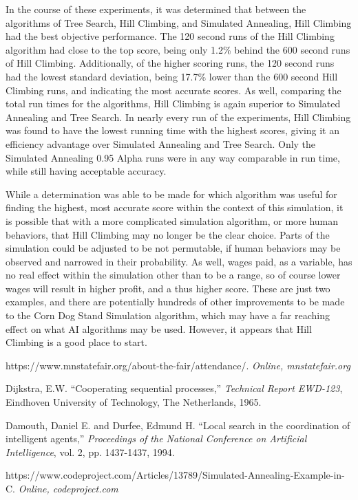 \documentclass[10pt, twocolumn]{article}
\begin{document}
In the course of these experiments, it was determined that between the algorithms of
Tree Search, Hill Climbing, and Simulated Annealing, Hill Climbing had the best objective performance.
The 120 second runs of the Hill Climbing algorithm had close to the top score, being only
1.2\% behind the 600 second runs of Hill Climbing. Additionally, of the higher scoring runs,
the 120 second runs had the lowest standard deviation, being 17.7\% lower than the 600 second Hill Climbing
runs, and indicating the most accurate scores.
As well, comparing the total run times for the algorithms, Hill Climbing is again superior to
Simulated Annealing and Tree Search. In nearly every run of the experiments, Hill Climbing was found
to have the lowest running time with the highest scores, giving it an efficiency
advantage over Simulated Annealing and Tree Search. Only the Simulated Annealing 0.95 Alpha runs
were in any way comparable in run time, while still having acceptable accuracy.

While a determination was able to be made for which algorithm was useful for finding
the highest, most accurate score within the context of this simulation, it is possible
that with a more complicated simulation algorithm, or more human behaviors, that Hill Climbing
may no longer be the clear choice. Parts of the simulation could be adjusted to be not
permutable, if human behaviors may be observed and narrowed in their probability.
As well, wages paid, as a variable, has no real effect within the simulation other
than to be a range, so of course lower wages will result in
higher profit, and a thus higher score. These are just two examples, and there are
potentially hundreds of other improvements to be made to the Corn Dog Stand Simulation
algorithm, which may have a far reaching effect on what AI algorithms
may be used. However, it appears that Hill Climbing is a good place to start.

\begin{thebibliography}{1}

 https://www.mnstatefair.org/about-the-fair/attendance/. {\em Online, mnstatefair.org}

 Dijkstra, E.W. ``Cooperating sequential processes,'' {\em Technical Report EWD-123}, Eindhoven University of Technology, The Netherlands, 1965.

 Damouth, Daniel E. and Durfee, Edmund H. ``Local search in the coordination of intelligent agents,'' {\em Proceedings of the National Conference on Artificial Intelligence}, vol. 2, pp. 1437-1437, 1994.

 https://www.codeproject.com/Articles/13789/Simulated-Annealing-Example-in-C. {\em Online, codeproject.com}

\end{thebibliography}
\end{document}

